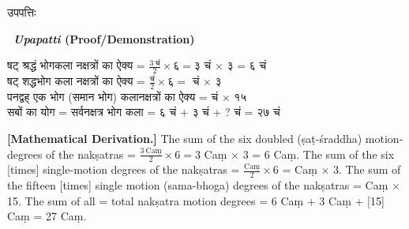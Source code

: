 \documentclass[11pt,a4paper]{article}
\newcommand{\dev}[1]{{\devanagarifont #1}}
\newcommand{\bilingualpair}[2]{%
  \noindent%
  \begin{minipage}[t]{0.48\textwidth}
    #1%
  \end{minipage}%
  \hfill%
  \begin{minipage}[t]{0.48\textwidth}
    #2%
  \end{minipage}%
  \par\vspace{0.5em}%
}
\newenvironment{sanskritcol}{\devanagarifont\small}{}
\newenvironment{englishcol}{\iastfont\small}{}
\begin{document}
\vspace{0.5cm}
\bilingualpair{%
\begin{sanskritcol}
\dev{उपपत्तिः}
\end{sanskritcol}%
}{%
\begin{englishcol}
\textbf{\textbar\ \textit{Upapatti} (Proof/Demonstration)}
\end{englishcol}%
}

\bilingualpair{%
\begin{sanskritcol}
\dev{षट् श्रद्धं भोगकला नक्षत्रों का ऐक्य =} $\frac{3\ \text{चं}}{2} \times \text{६} = ३$ \dev{चं × ३ = ६ चं}\\[0.3em]
\dev{षट् शद्धभोग कला नक्षत्रों का ऐक्य =} $\frac{\text{चं}}{2} \times \text{६} =$ \dev{चं × ३}\\[0.3em]
\dev{पनद्वह् एक भोग (समान भोग) कलानक्षत्रों का ऐक्य = चं × १५}\\[0.3em]
\dev{सबों का योग = सर्वनक्षत्र भोग कला = ६ चं + ३ चं + ? चं = २७ चं}
\end{sanskritcol}%
}{%
\begin{englishcol}
\textbf{[Mathematical Derivation.]} The sum of the six doubled (ṣaṭ-\-śraddha) motion-degrees of the nakṣatras = $\frac{3\ \text{Caṃ}}{2} \times 6 = 3$ Caṃ $\times$ 3 = 6 Caṃ. The sum of the six [times] single-motion degrees of the nakṣatras = $\frac{\text{Caṃ}}{2} \times 6$ = Caṃ $\times$ 3. The sum of the fifteen [times] single motion (sama-bhoga) degrees of the nakṣatras = Caṃ $\times$ 15. The sum of all = total nakṣatra motion degrees = 6 Caṃ + 3 Caṃ + [15] Caṃ = 27 Caṃ.
\end{englishcol}%
}
\end{document}

